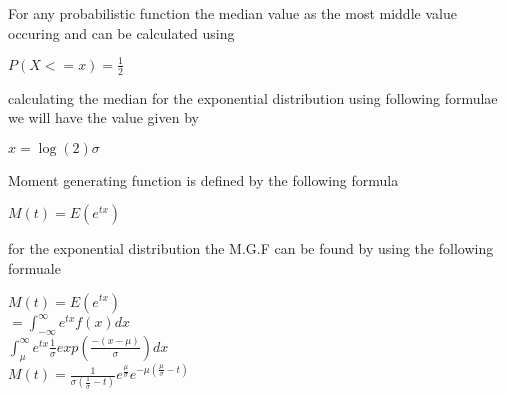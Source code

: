 \documentclass[12pt]{article}
\begin{document}
For any probabilistic function the median value as the most middle value occuring and can be calculated using 
\begin{center}
	$P(X<=x)=\frac{1}{2}$\\
\end{center}
calculating the median for the exponential distribution using following formulae we will have the value given by
\begin{center}
	$x=\log(2)\sigma$
\end{center}
 Moment generating function is defined by the following formula
 \begin{center}
 	$M(t)=E(e^{tx})$
 \end{center}
 for the exponential distribution the M.G.F can be found by using the following formuale
 \begin{center}
 	$M(t)=E(e^{tx})$\\
 	$=\int_{-\infty}^{\infty} e^{tx}f(x) dx$\\
 	$\int_{\mu}^{\infty} e^{tx} \frac{1}{\sigma} exp(\frac{-(x-\mu)}{\sigma}) dx$\\
 	$M(t)=\frac{1}{\sigma (\frac{1}{\sigma}-t)} e^{\frac{\mu}{\sigma}} e^{-\mu(\frac{\mu}{\sigma}-t)} $\\
 \end{center} 
 
\end{document}
